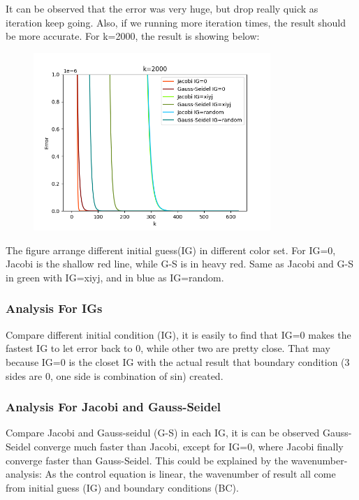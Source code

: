 \documentclass[12pt]{article}
\begin{document}
It can be observed that the error was very huge, but drop really quick
as iteration keep going. Also, if we running more iteration times, the result should be more
accurate. For k=2000, the result is showing below:

\begin{figure}[H]
    \centering
    \includegraphics[width=0.8\textwidth]{allIGdetails.png}
    \label{allIGdetails.png}
\end{figure}

The figure arrange different initial guess(IG) in different color set.
For IG=0, Jacobi is the shallow red line, while G-S is in heavy red.
Same as Jacobi and G-S in green with IG=xiyj, and in blue as IG=random.\\


\subsubsection{Analysis For IGs}
Compare different initial condition (IG), it is easily to find that 
IG=0 makes the fastest IG to let error back to 0, while other two are 
pretty close. That may because IG=0 is the closet IG with the actual 
result that boundary condition (3 sides are 0, one side is combination
of sin) created.\\



\subsubsection{Analysis For Jacobi and Gauss-Seidel}

Compare Jacobi and Gauss-seidul (G-S) in each IG, it is can be observed
Gauss-Seidel converge much faster than Jacobi, except for IG=0, where 
Jacobi finally converge faster than Gauss-Seidel.
This could be explained by the wavenumber-analysis:
As the control equation is linear, the wavenumber of result all come from initial guess
(IG) and boundary conditions (BC).\\
\end{document}
